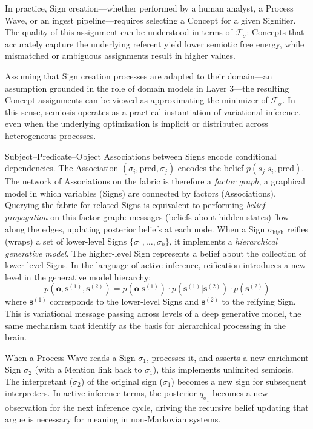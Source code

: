 \documentclass[11pt,a4paper]{article}
\theoremstyle{definition}
\newcommand{\bq}{q}
\newcommand{\bp}{p}
\newcommand{\bo}{\bm{o}}
\newcommand{\bs}{\bm{s}}
\begin{document}
In practice, Sign creation—whether performed by a human analyst, a Process Wave, or an ingest pipeline—requires selecting a Concept for a given Signifier. The quality of this assignment can be understood in terms of $\mathcal{F}_\sigma$: Concepts that accurately capture the underlying referent yield lower semiotic free energy, while mismatched or ambiguous assignments result in higher values.

Assuming that Sign creation processes are adapted to their domain—an assumption grounded in the role of domain models in Layer 3—the resulting Concept assignments can be viewed as approximating the minimizer of $\mathcal{F}_\sigma$. In this sense, semiosis operates as a practical instantiation of variational inference, even when the underlying optimization is implicit or distributed across heterogeneous processes.

Subject--Predicate--Object Associations between Signs encode conditional dependencies. The Association $(\sigma_i, \text{pred}, \sigma_j)$ encodes the belief $\bp(s_j | s_i, \text{pred})$. The network of Associations on the fabric is therefore a \emph{factor graph}, a graphical model in which variables (Signs) are connected by factors (Associations). Querying the fabric for related Signs is equivalent to performing \emph{belief propagation} on this factor graph: messages (beliefs about hidden states) flow along the edges, updating posterior beliefs at each node.
When a Sign $\sigma_{\text{high}}$ reifies (wraps) a set of lower-level Signs $\{\sigma_1, \ldots, \sigma_k\}$, it implements a \emph{hierarchical generative model}. The higher-level Sign represents a belief about the collection of lower-level Signs. In the language of active inference, reification introduces a new level in the generative model hierarchy:
\begin{equation}
\bp(\bo, \bs^{(1)}, \bs^{(2)}) = \bp(\bo | \bs^{(1)}) \cdot \bp(\bs^{(1)} | \bs^{(2)}) \cdot \bp(\bs^{(2)})
\end{equation}
where $\bs^{(1)}$ corresponds to the lower-level Signs and $\bs^{(2)}$ to the reifying Sign. This is variational message passing across levels of a deep generative model, the same mechanism that \citet{ramstead2023inner} identify as the basis for hierarchical processing in the brain.

When a Process Wave reads a Sign $\sigma_1$, processes it, and asserts a new enrichment Sign $\sigma_2$ (with a Mention link back to $\sigma_1$), this implements unlimited semiosis. The interpretant ($\sigma_2$) of the original sign ($\sigma_1$) becomes a new sign for subsequent interpreters. In active inference terms, the posterior $\bq_{\sigma_1}$ becomes a new observation for the next inference cycle, driving the recursive belief updating that \citet{albarracin2025nonmarkovian} argue is necessary for meaning in non-Markovian systems.
\end{document}
